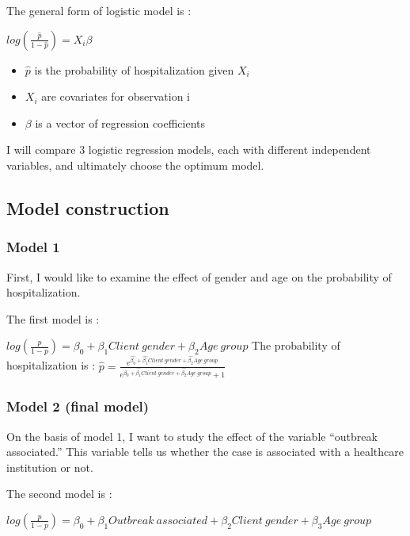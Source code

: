 \documentclass[
]{article}
\providecommand{\tightlist}{%
  \setlength{\itemsep}{0pt}\setlength{\parskip}{0pt}}
\begin{document}
The general form of logistic model is :

\(log(\frac{\hat{p}}{1-\hat{p}}) = X_i\beta\)

\begin{itemize}
\tightlist
\item
  \(\hat{p}\) is the probability of hospitalization given \(X_i\)
\item
  \(X_i\) are covariates for observation i
\item
  \(\beta\) is a vector of regression coefficients
\end{itemize}

I will compare 3 logistic regression models, each with different independent variables, and ultimately choose the optimum model.

\hypertarget{model-construction}{%
\subsection{Model construction}\label{model-construction}}

\hypertarget{model-1}{%
\subsubsection{Model 1}\label{model-1}}

First, I would like to examine the effect of gender and age on the probability of hospitalization.

The first model is :

\(log(\frac{p}{1-p})=\beta_0+\beta_1Client \ gender+\beta_2Age \ group\)
The probability of hospitalization is :
\(\hat{p}=\frac{e^{\hat{\beta_0}+\hat{\beta_1}Client \ gender+\hat{\beta_2}Age \ group}}{e^{\beta_0+\hat{\beta_1}Client \ gender+\hat{\beta_2}Age \ group}+1}\)

\hypertarget{model-2-final-model}{%
\subsubsection{Model 2 (final model)}\label{model-2-final-model}}

On the basis of model 1, I want to study the effect of the variable ``outbreak associated.'' This variable tells us whether the case is associated with a healthcare institution or not.

The second model is :

\(log(\frac{p}{1-p}) = \beta_0 + \beta_1Outbreak \ associated + \beta_2Client \ gender + \beta_3Age \ group\)
\end{document}
